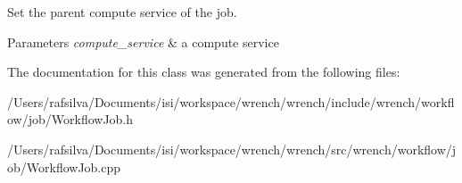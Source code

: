Set the parent compute service of the job. 


\begin{DoxyParams}{Parameters}
{\em compute\+\_\+service} & a compute service \\
\hline
\end{DoxyParams}


The documentation for this class was generated from the following files\+:\begin{DoxyCompactItemize}
\item 
/\+Users/rafsilva/\+Documents/isi/workspace/wrench/wrench/include/wrench/workflow/job/Workflow\+Job.\+h\item 
/\+Users/rafsilva/\+Documents/isi/workspace/wrench/wrench/src/wrench/workflow/job/Workflow\+Job.\+cpp\end{DoxyCompactItemize}
